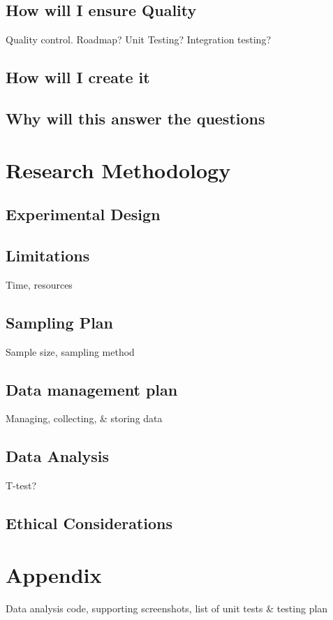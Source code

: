 \documentclass[lettersize,journal]{IEEEtran}
\begin{document}
    \subsection{How will I ensure Quality}
        Quality control. Roadmap? Unit Testing? Integration testing?

    \subsection{How will I create it}

    \subsection{Why will this answer the questions}

\section{Research Methodology}
    \subsection{Experimental Design}

    \subsection{Limitations}
        Time, resources

    \subsection{Sampling Plan}
        Sample size, sampling method

    \subsection{Data management plan}
        Managing, collecting, \& storing data

    \subsection{Data Analysis}
        T-test?
    \subsection{Ethical Considerations}

\section{Appendix}
    Data analysis code, supporting screenshots, list of unit tests \& testing plan



\end{document}
